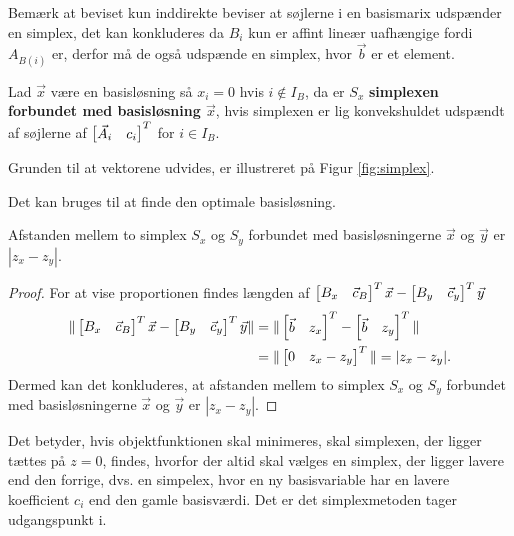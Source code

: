 Bemærk at beviset kun inddirekte beviser at søjlerne i en basismarix udspænder en simplex, det kan konkluderes da $B_i$ kun er affint lineær uafhængige fordi $A_{B(i)}$ er, derfor må de også udspænde en simplex, hvor $\vec{b}$ er et element.
\begin{defn}
Lad $\vec{x}$ være en basisløsning så $x_i = 0$ hvis $i \notin I_B$, da er $S_x$ \textbf{simplexen forbundet med basisløsning $\vec{x}$}, hvis simplexen er lig konvekshuldet udspændt af søjlerne af $\begin{bmatrix} \vec{A}_i & c_i \end{bmatrix}^T$ for $i \in I_B$.
\end{defn}
Grunden til at vektorene udvides, er illustreret på Figur \ref{fig:simplex}. 
\begin{center}
	
	\label{fig:simplex}
\end{center}
Det kan bruges til at finde den optimale basisløsning. 
\begin{prop}
Afstanden mellem to simplex $S_x$ og $S_y$ forbundet med basisløsningerne $\vec{x}$ og $\vec{y}$ er $|z_x - z_y|$.
\end{prop}
\begin{proof}
For at vise proportionen findes længden af $\begin{bmatrix} B_x & \vec{c}_B \end{bmatrix}^T \vec{x} - \begin{bmatrix} B_y & \vec{c}_y \end{bmatrix}^T \vec{y}$
\begin{align*}
 \Vert \begin{bmatrix} B_x & \vec{c}_B \end{bmatrix}^T \vec{x} - \begin{bmatrix} B_y & \vec{c}_y \end{bmatrix}^T \vec{y} \Vert & =  \Vert \begin{bmatrix} \vec{b} & z_x \end{bmatrix}^T  - \begin{bmatrix} \vec{b} & z_y \end{bmatrix}^T  \Vert
 \\ & = \Vert \begin{bmatrix} 0 & z_x - z_y \end{bmatrix}^T \Vert = |z_x - z_y|.
\end{align*}
Dermed kan det konkluderes, at afstanden mellem to simplex $S_x$ og $S_y$ forbundet med basisløsningerne $\vec{x}$ og $\vec{y}$ er $|z_x - z_y|$.
\end{proof}
Det betyder, hvis objektfunktionen skal minimeres, skal simplexen, der ligger tættes på $z = 0$, findes, hvorfor der altid skal vælges en simplex, der ligger lavere end den forrige, dvs. en simpelex, hvor en ny basisvariable har en lavere koefficient $c_i$ end den gamle basisværdi.
Det er det simplexmetoden tager udgangspunkt i.

